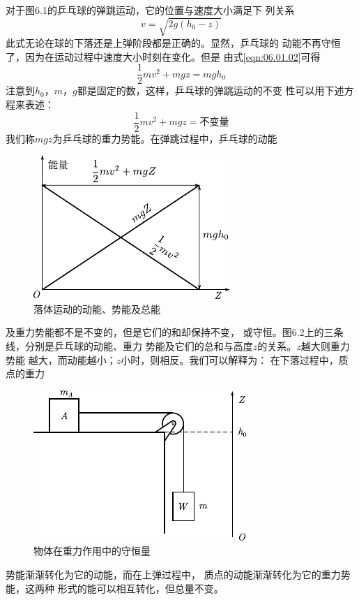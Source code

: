 对于图6.1的乒乓球的弹跳运动，它的位置与速度大小满足下
列关系
\begin{equation}\label{eqn:06.01.02}
 v = \sqrt { 2 g ( h _ { 0 } - z ) }
\end{equation}
此式无论在球的下落还是上弹阶段都是正确的。显然，乒乓球的
动能不再守恒了，因为在运动过程中速度大小时刻在变化。但是
由式\eqref{eqn:06.01.02}可得
\begin{equation}\label{eqn:06.01.03}
 \frac { 1 } { 2 } m v ^ { 2 } + m g z = m g h _ { 0 }
\end{equation}
注意到$ h _ { 0 } $，$ m $，$ g $都是固定的数，这样，乒乓球的弹跳运动的不变
性可以用下述方程来表述：
\begin{equation}\label{eqn:06.01.04}
 \frac { 1 } { 2 } m v ^ { 2 } + m g z = \text{不变量}
\end{equation}
我们称$ mgz $为乒乓球的重力势能。在弹跳过程中，乒乓球的动能
\begin{figure}
 \centering
 \includegraphics{figure/fig06.02}\vspace{0.6em}
 \caption{落体运动的动能、势能及总能}
 \label{fig:06.02}
\end{figure}
及重力势能都不是不变的，但是它们的和却保持不变，
或守恒。图6.2上的三条线，分别是乒乓球的动能、重力
势能及它们的总和与高度$ z $的关系。$ z $越大则重力势能
越大，而动能越小；$ z $小时，则相反。我们可以解释为：
在下落过程中，质点的重力
\clearpage
\begin{figure}
 \vspace{1em}
 \centering
 \includegraphics{figure/fig06.03}\vspace{1em}
 \caption{物体在重力作用中的守恒量}
 \label{fig:06.03}
\end{figure}
\noindent 势能渐渐转化为它的动能，而在上弹过程中，
质点的动能渐渐转化为它的重力势能，这两种
形式的能可以相互转化，但总量不变。

